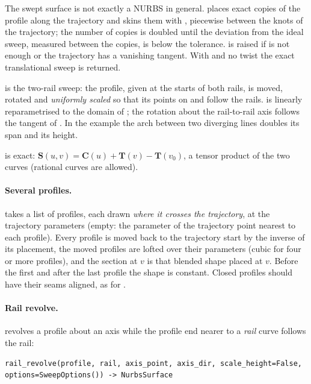 The swept surface is not exactly a NURBS in general. \NF{} places exact copies of the profile
along the trajectory and skins them with , piecewise between the knots of the
trajectory; the number of copies is doubled until the deviation from the ideal sweep, measured
between the copies, is below the tolerance.  is raised if
 is not enough or the trajectory has a vanishing tangent. With
 and no twist the exact translational sweep is returned.

 is the two-rail sweep: the profile, given at the starts of both rails, is moved,
rotated and \emph{uniformly scaled} so that its points on  and  follow
the rails.  is linearly reparametrised to the domain of ; the rotation
about the rail-to-rail axis follows the tangent of . In the example the arch between
two diverging lines doubles its span and its height.

 is exact: $\mathbf S(u,v) = \mathbf C(u) + \mathbf T(v) -
\mathbf T(v_0)$, a tensor product of the two curves (rational curves are allowed).

\paragraph{Several profiles.}  takes a
list of profiles, each drawn \emph{where it crosses the trajectory}, at the trajectory
parameters  (empty: the parameter of the trajectory point nearest to each
profile). Every profile is moved back to the trajectory start by the inverse of its placement,
the moved profiles are lofted over their parameters (cubic for four or more profiles), and the
section at $v$ is that blended shape placed at $v$. Before the first and after the last profile
the shape is constant. Closed profiles should have their seams aligned, as for .

\paragraph{Rail revolve.}  revolves a profile about an axis while the
profile end nearer to a \emph{rail} curve follows the rail:

\begin{lstlisting}[style=text]
rail_revolve(profile, rail, axis_point, axis_dir, scale_height=False, options=SweepOptions()) -> NurbsSurface
\end{lstlisting}

